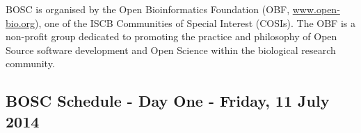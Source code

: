 \documentclass[10pt,oneside]{article}
\begin{document}
\pagestyle{fancy}

\noindent
BOSC is organised by the Open Bioinformatics Foundation
(OBF, \href{http://www.open-bio.org}{www.open-bio.org}),
one of the ISCB Communities of Special Interest (COSIs).
The OBF is a non-profit group dedicated to promoting the practice and
philosophy of Open Source software development and Open Science within
the biological research community.

\subsection*{BOSC Schedule - Day One - Friday, 11 July 2014}
\end{document}
